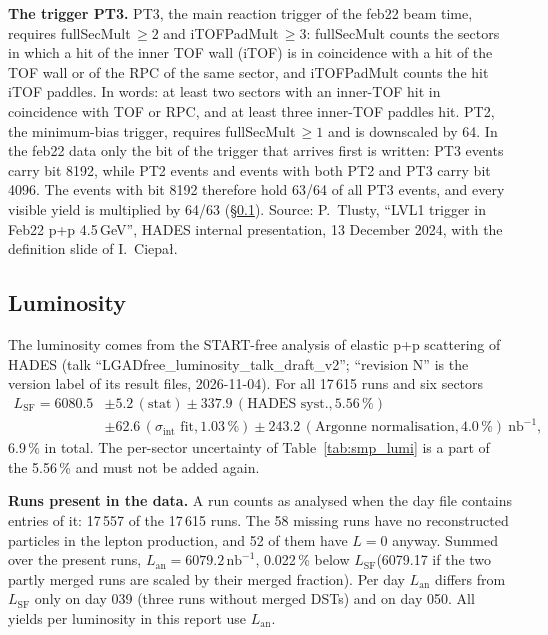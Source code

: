 \documentclass[11pt,a4paper]{article}
\newcommand{\nbinv}{\ensuremath{\mathrm{nb}^{-1}}\xspace}
\newcommand{\code}[1]{\texttt{\detokenize{#1}}}
\newcommand{\Lsf}{\ensuremath{L_{\mathrm{SF}}}\xspace}
\newcommand{\Lan}{\ensuremath{L_{\mathrm{an}}}\xspace}
\begin{document}
\textbf{The trigger PT3.} PT3, the main reaction trigger of the feb22 beam time, requires fullSecMult\,$\ge2$ and
iTOFPadMult\,$\ge3$: fullSecMult counts the sectors in which a hit of the inner TOF wall (iTOF) is in coincidence with a hit
of the TOF wall or of the RPC of the same sector, and iTOFPadMult counts the hit iTOF paddles. In words: at least two sectors
with an inner-TOF hit in coincidence with TOF or RPC, and at least three inner-TOF paddles hit. PT2, the minimum-bias trigger,
requires fullSecMult\,$\ge1$ and is downscaled by 64. In the feb22 data only the bit of the trigger that arrives first is
written: PT3 events carry bit 8192, while PT2 events and events with both PT2 and PT3 carry bit 4096. The events with bit 8192
therefore hold 63/64 of all PT3 events, and every visible yield is multiplied by 64/63 (\S\ref{sec:lumi}). Source:
P.~Tlusty, ``LVL1 trigger in Feb22 p+p 4.5\,GeV'', HADES internal presentation, 13 December 2024, with the definition
slide of I.~Ciepa{\l}.

\subsection{Luminosity}
\label{sec:lumi}
The luminosity comes from the START-free analysis of elastic p+p scattering of HADES (talk
``LGADfree\_luminosity\_talk\_draft\_v2''; ``revision N'' is the version label of its result files, 2026-11-04). For all 17\,615 runs and
six sectors
\begin{align*}
\Lsf = 6080.5 &\pm 5.2\,(\mathrm{stat}) \pm 337.9\,(\text{HADES syst.}, 5.56\,\%)\\
&\pm 62.6\,(\sigma_{\mathrm{int}}\text{ fit}, 1.03\,\%) \pm 243.2\,(\text{Argonne normalisation}, 4.0\,\%)\ \nbinv,
\end{align*}
6.9\,\% in total. The per-sector uncertainty of Table~\ref{tab:smp_lumi} is a part of the 5.56\,\% and must
not be added again.

\textbf{Runs present in the data.} A run counts as analysed when the day file contains \code{EpEm_ID} entries
of it: 17\,557 of the 17\,615 runs. The 58 missing runs have no reconstructed particles in the lepton
production, and 52 of them have $L=0$ anyway. Summed over the present runs,
$\Lan=6079.2\,\nbinv$, 0.022\,\% below \Lsf (6079.17 if the two partly merged runs are scaled by their
merged fraction). Per day \Lan differs from \Lsf only on day 039 (three runs without merged DSTs) and on
day 050. All yields per luminosity in this report use \Lan.
\end{document}

